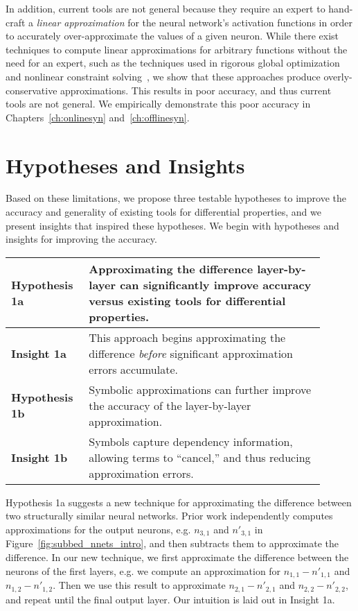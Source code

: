 In addition, current tools are not general because they require an expert to
hand-craft a \textit{linear approximation} for the neural network's activation
functions in order to accurately over-approximate the values of a given neuron.
While there exist techniques to compute linear approximations for arbitrary
functions without the need for an expert, such as the techniques used in rigorous global
optimization~\cite{chabert2009contractor,trombettoni2011inner} and nonlinear
constraint solving~\cite{gao2013dreal}, we
show that these approaches produce overly-conservative approximations. This
results in poor accuracy, and thus current tools are not general. We
empirically demonstrate this poor accuracy in Chapters~\ref{ch:onlinesyn}
and~\ref{ch:offlinesyn}.


\section{Hypotheses and Insights}
Based on these limitations, we propose three testable hypotheses to improve the
accuracy and generality of existing tools for differential properties, and we
present insights that inspired these hypotheses. We begin with hypotheses and
insights for improving the accuracy.

\begin{table}[h]
	\centering
	\large
	\begin{tabular}{|p{0.2\linewidth}|p{0.7\linewidth}|} \hline
		\textbf{Hypothesis 1a}      &
		Approximating the difference layer-by-layer can significantly improve
		accuracy versus existing tools for differential properties. \\ \hline
		\textbf{Insight 1a}        &
		This approach begins approximating the difference \textit{before}
		significant approximation errors accumulate. \\ \hline
		\textbf{Hypothesis 1b}        &
		Symbolic approximations can further improve the accuracy of the
		layer-by-layer approximation. \\ \hline
		\textbf{Insight 1b}        &
		Symbols capture dependency information, allowing terms to
		``cancel,'' and thus reducing approximation errors. \\ \hline
	\end{tabular}
\end{table}

Hypothesis 1a suggests a new technique for approximating the difference between
two structurally similar neural networks. Prior work independently computes
approximations for the output neurons, e.g. $ n_{3,1} $ and $ n'_{3,1} $ in
Figure~\ref{fig:subbed_nnets_intro}, and then subtracts them to approximate the
difference. In our
new technique, we first approximate the difference between the neurons of the
first layers, e.g. we compute an approximation for $ n_{1,1} - n'_{1,1} $ and $
n_{1,2} - n'_{1,2} $. Then we use this result to approximate $ n_{2,1} - n'_{2,1}
$ and $ n_{2,2} - n'_{2,2} $, and repeat until the final output layer. Our
intuition is laid out in Insight 1a.


